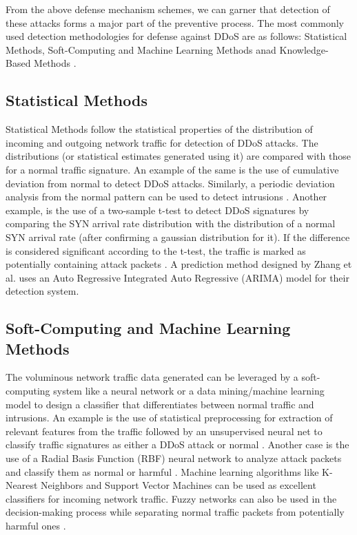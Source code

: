 From the above defense mechanism schemes, we can garner that detection of these attacks forms a major part of the preventive process. The most commonly used detection methodologies for defense against DDoS are as follows: Statistical Methods, Soft-Computing and Machine Learning Methods anad Knowledge-Based Methods \cite{monowar01}.

\subsection{Statistical Methods}
Statistical Methods follow the statistical properties of the distribution of incoming and outgoing network traffic for detection of DDoS attacks. The distributions (or statistical estimates generated using it) are compared with those for a normal traffic signature. An example of the same is the use of cumulative deviation from normal to detect DDoS attacks. Similarly, a periodic deviation analysis from the normal pattern can be used to detect intrusions \cite{monowar01}. Another example, is the use of a two-sample t-test to detect DDoS signatures by comparing the SYN arrival rate distribution with the distribution of a normal SYN arrival rate (after confirming a gaussian distribution for it). If the difference is considered significant according to the t-test, the traffic is marked as potentially containing attack packets \cite{monowar01}. A prediction method designed by Zhang et al. \cite{zhang05} uses an Auto Regressive Integrated Auto Regressive (ARIMA) model for their detection system.

\subsection{Soft-Computing and Machine Learning Methods}
The voluminous network traffic data generated can be leveraged by a soft-computing system like a neural network or a data mining/machine learning model to design a classifier that differentiates between normal traffic and intrusions. An example is the use of statistical preprocessing for extraction of relevant features from the traffic followed by an unsupervised neural net to classify traffic signatures as either a DDoS attack or normal \cite{monowar01}. Another case is the use of a Radial Basis Function (RBF) neural network to analyze attack packets and classify them as normal or harmful \cite{monowar01}. Machine learning algorithms like K-Nearest Neighbors and Support Vector Machines can be used as excellent classifiers for incoming network traffic. Fuzzy networks can also be used in the decision-making process while separating normal traffic packets from potentially harmful ones \cite{monowar01}.

